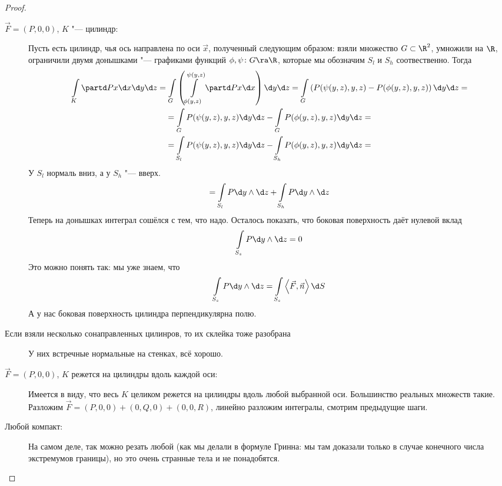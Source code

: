 \begin{proof}\begin{description}
\item[$\vec F = (P, 0, 0)$, $K$ "--- цилиндр:]
	Пусть есть цилиндр, чья ось направлена по оси $\vec x$, полученный следующим образом:
	взяли множество $G \subset \R^2$, умножили на $\R$, ограничили двумя донышками "--- графиками функций $\phi, \psi\colon G \ra \R$,
	которые мы обозначим $S_l$ и $S_h$ соотвественно.
	Тогда
	\begin{gather*}
		\int\limits_K \partd Px \d x \d y \d z
		= \int\limits_G \left( \int\limits_{\phi(y,z)}^{\psi(y,z)} \partd Px \d x\right) \d y \d z
		= \int\limits_G \left( P(\psi(y,z), y, z) - P(\phi(y,z), y, z) \right) \d y \d z = \\
		= \int\limits_G P(\psi(y,z), y, z) \d y \d z - \int\limits_G P(\phi(y,z), y, z) \d y \d z = \\
		= \int\limits_{S_l} P(\psi(y,z), y, z) \d y \d z - \int\limits_{S_h} P(\phi(y,z), y, z) \d y \d z =
	\end{gather*}
	У $S_l$ нормаль вниз, а у $S_h$ "--- вверх.
	\begin{gather*}
		= \int\limits_{S_l} P \d y \wedge \d z + \int\limits_{S_h} P \d y \wedge \d z
	\end{gather*}
	Теперь на донышках интеграл сошёлся с тем, что надо.
	Осталось показать, что боковая поверхность даёт нулевой вклад
	\[ \int\limits_{S_s} P \d y \wedge \d z = 0 \]
	Это можно понять так: мы уже знаем, что
	\[ \int\limits_{S_s} P \d y \wedge \d z = \int\limits_{S_s} \left<\vec F, \vec n\right> \d S \]
	А у нас боковая поверхность цилиндра перпендикулярна полю.

\item[Если взяли несколько сонаправленных цилинров, то их склейка тоже разобрана]
	У них встречные нормальные на стенках, всё хорошо.

\item[$\vec F = (P, 0, 0)$, $K$ режется на цилиндры вдоль каждой оси:]
	Имеется в виду, что весь $K$ целиком режется на цилиндры вдоль любой выбранной оси.
	Большинство реальных множеств такие.
	Разложим $\vec F = (P, 0, 0) + (0, Q, 0) + (0, 0, R)$, линейно разложим интегралы, смотрим предыдущие шаги.

\item[Любой компакт:]
	На самом деле, так можно резать любой (как мы делали в формуле Гринна: мы там доказали только в случае конечного числа экстремумов границы),
	но это очень странные тела и не понадобятся.
\end{description}\end{proof}

